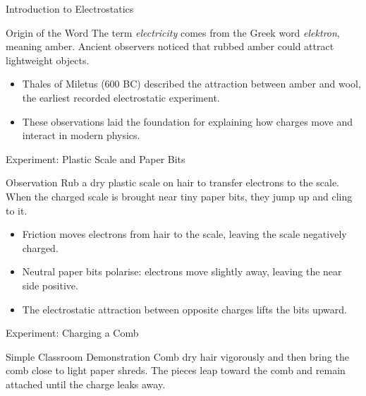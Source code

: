 \begin{frame}
\begin{frame}[plain]
\end{frame}
\begin{frame}{Introduction to Electrostatics}
    \begin{conceptdiagram}{Origin of the Word}
        The term \textit{electricity} comes from the Greek word \textit{elektron}, meaning amber. Ancient observers noticed that rubbed amber could attract lightweight objects.
    \end{conceptdiagram}

    \begin{itemize}
        \item Thales of Miletus (600 BC) described the attraction between amber and wool, the earliest recorded electrostatic experiment.
        \item These observations laid the foundation for explaining how charges move and interact in modern physics.
    \end{itemize}
\end{frame}

\begin{frame}{Experiment: Plastic Scale and Paper Bits}
    \begin{conceptdiagram}{Observation}
        Rub a dry plastic scale on hair to transfer electrons to the scale. When the charged scale is brought near tiny paper bits, they jump up and cling to it.
    \end{conceptdiagram}

    \begin{itemize}
        \item Friction moves electrons from hair to the scale, leaving the scale negatively charged.
        \item Neutral paper bits polarise: electrons move slightly away, leaving the near side positive.
        \item The electrostatic attraction between opposite charges lifts the bits upward.
    \end{itemize}
\end{frame}
\begin{frame}{Experiment: Charging a Comb}
    \begin{conceptdiagram}{Simple Classroom Demonstration}
        Comb dry hair vigorously and then bring the comb close to light paper shreds. The pieces leap toward the comb and remain attached until the charge leaks away.
    \end{conceptdiagram}


\end{frame}
\end{frame}
